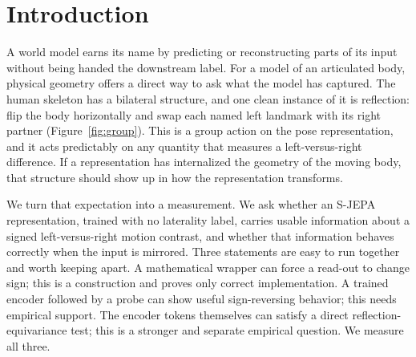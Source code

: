 \documentclass{article}
\begin{document}
\section{Introduction}

A world model earns its name by predicting or reconstructing parts of its input without being handed the downstream label. For a model of an articulated body, physical geometry offers a direct way to ask what the model has captured. The human skeleton has a bilateral structure, and one clean instance of it is reflection: flip the body horizontally and swap each named left landmark with its right partner (Figure~\ref{fig:group}). This is a group action on the pose representation, and it acts predictably on any quantity that measures a left-versus-right difference. If a representation has internalized the geometry of the moving body, that structure should show up in how the representation transforms.

We turn that expectation into a measurement. We ask whether an S-JEPA representation, trained with no laterality label, carries usable information about a signed left-versus-right motion contrast, and whether that information behaves correctly when the input is mirrored. Three statements are easy to run together and worth keeping apart. A mathematical wrapper can force a read-out to change sign; this is a construction and proves only correct implementation. A trained encoder followed by a probe can show useful sign-reversing behavior; this needs empirical support. The encoder tokens themselves can satisfy a direct reflection-equivariance test; this is a stronger and separate empirical question. We measure all three.
\end{document}
